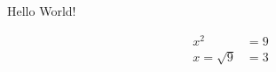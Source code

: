 \documentclass{article}
\begin{document}
Hello World!

\begin{align}
  x^2 &= 9 \\
  x = \sqrt{9} &= 3
\end{align}
\end{document}
